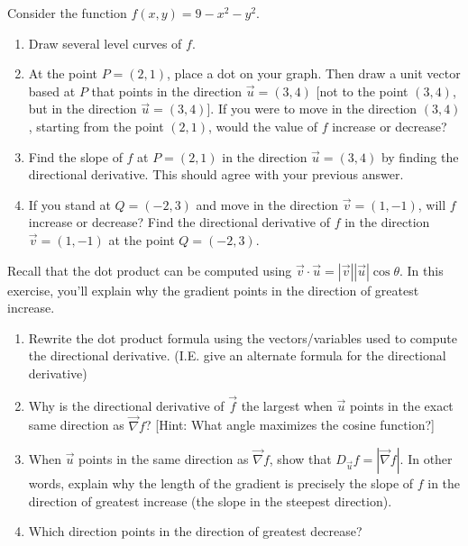 \begin{problem}%
 Consider the function $f(x,y) = 9-x^2-y^2$.
 \begin{enumerate}
  \item Draw several level curves of $f$. 
  \item At the point $P=(2,1)$, place a dot on your graph. Then draw a unit vector based at $P$ that points in the direction $\vec u=(3,4)$ [not to the point $(3,4)$, but in the direction $\vec u=(3,4)$]. If you were to move in the direction $(3,4)$, starting from the point $(2,1)$, would the value of $f$ increase or decrease?
  \item Find the slope of $f$ at $P=(2,1)$ in the direction $\vec u=(3,4)$ by finding the directional derivative. This should agree with your previous answer.
  \item If you stand at $Q=(-2,3)$ and move in the direction $\vec v= (1,-1)$, will $f$ increase or decrease?  Find the directional derivative of $f$ in the direction $\vec v=(1,-1)$ at the point $Q=(-2,3)$.
 \end{enumerate}
\end{problem}

\begin{problem}
Recall that the dot product can be computed using $\vec{v} \cdot \vec{u} = |\vec{v}||\vec{u}|\cos \theta$. In this exercise, you'll explain why the gradient points in the direction of greatest increase.
\begin{enumerate}
	\item Rewrite the dot product formula using the vectors/variables used to compute the directional derivative. (I.E. give an alternate formula for the directional derivative)
 \item Why is the directional derivative of $\vec f$ the largest when $\vec u$ points in the exact same direction as $\vec \nabla f$? [Hint: What angle maximizes the cosine function?]
 \item When $\vec u$ points in the same direction as $\vec \nabla f$, show that $D_{\vec u}f = |\vec \nabla f|$. In other words, explain why the length of the gradient is precisely the slope of $f$ in the direction of greatest increase (the slope in the steepest direction). 
 \item Which direction points in the direction of greatest decrease?
\end{enumerate}
\end{problem}

